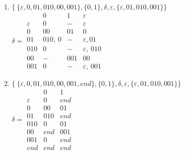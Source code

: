 \documentclass[12pt]{article}
\newenvironment{problem}[2][Problem]{\begin{trivlist}
\item[\hskip \labelsep {\bfseries #1}\hskip \labelsep {\bfseries #2.}]}{\end{trivlist}}
\begin{document}
\begin{problem}{1.17}
\end{problem}
\begin{enumerate}
	\item[(a)]
		$\{ \: \{\varepsilon, 0, 01, 010, 00, 001\}, \{0, 1\}, \delta, \varepsilon, \{\varepsilon, 01, 010, 001\}\}$	\\
		$\delta = 
		\begin{array}{ c|c|c|c }
			 & 0 & 1 & \varepsilon\\
			\hline
			\varepsilon & 0 & - & \varepsilon\\
			\hline
			0 & 00 & 01 & 0\\
			\hline
			01 & 010,\ 0 & - & \varepsilon,01\\
			\hline
			010 & 0 & - & \varepsilon,\ 010\\
			\hline
			00 & - & 001 & 00\\
			\hline
			001 & 0 & - & \varepsilon,\ 001
		\end{array}$\\
	\item[(b)]
		$\{ \: \{\varepsilon, 0, 01, 010, 00, 001, end\}, \{0, 1\}, \delta, \varepsilon, \{\varepsilon, 01, 010, 001\}\}$	\\
		$\delta = 
		\begin{array}{ c|c|c }
			 & 0 & 1\\
			\hline
			\varepsilon & 0 & end\\
			\hline
			0 & 00 & 01\\
			\hline
			01 & 010 & end\\
			\hline
			010 & 0 & 01\\
			\hline
			00 & end & 001\\
			\hline
			001 & 0 & end\\
			\hline
			end & end & end
		\end{array}$\\

\end{enumerate}
\end{document}
